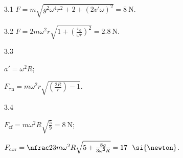 \protect \section *{\protect {}}
\begin{Solution}{3.{1}}
		$F = m\sqrt{g^2  \omega^4 r^2 + 2 + (2v'\omega)^2} = 8~\si{\newton}$.
	
\end{Solution}
\begin{Solution}{3.{2}}
		$F = 2m\omega^2r\sqrt{1 + \left(\frac{v_0}{\omega r} \right)^2 } = 2.8~\si{\newton}$.
	
\end{Solution}
\begin{Solution}{3.{3}}
		\begin{enumerate*}[label=(\alph*)]
			\item $a' = \omega^2 R$;
			\item $F_{\mathrm{\tau n}} = m\omega^2 r \sqrt{\left( \frac{2R}{r}\right) - 1}$.
		\end{enumerate*}
	
\end{Solution}
\begin{Solution}{3.{4}}
		\begin{enumerate*}[label=(\alph*)]
			\item $F_{\mathrm{cf}} = m\omega^2 R \sqrt{\frac59} = 8~\si{\newton}$;
			\item $F_{\mathrm{cor}} = \nfrac23 m\omega^2 R \sqrt{5 + \frac{8g}{3\omega^2R}} = 17~~\si{\newton}$.
		\end{enumerate*}
	
\end{Solution}
